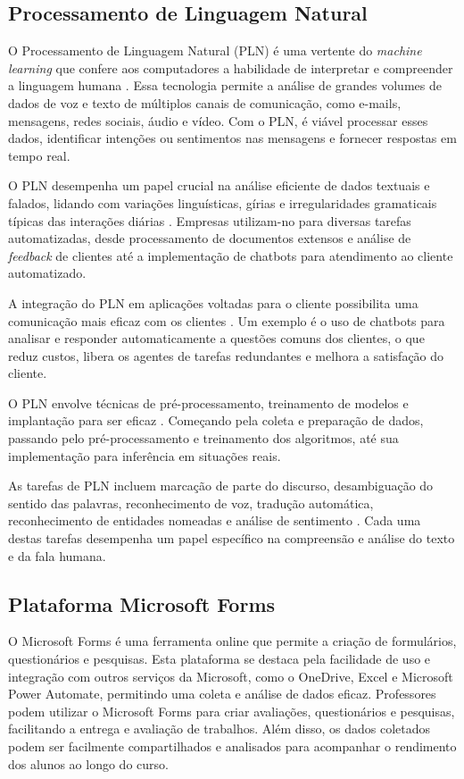 \subsection{Processamento de Linguagem Natural}

O Processamento de Linguagem Natural (PLN) é uma vertente do \textit{machine learning} que confere aos computadores a habilidade de interpretar e compreender a linguagem humana \cite{amazonnlp2023}. Essa tecnologia permite a análise de grandes volumes de dados de voz e texto de múltiplos canais de comunicação, como e-mails, mensagens, redes sociais, áudio e vídeo. Com o PLN, é viável processar esses dados, identificar intenções ou sentimentos nas mensagens e fornecer respostas em tempo real.

O PLN desempenha um papel crucial na análise eficiente de dados textuais e falados, lidando com variações linguísticas, gírias e irregularidades gramaticais típicas das interações diárias \cite{amazonnlp2023}. Empresas utilizam-no para diversas tarefas automatizadas, desde processamento de documentos extensos e análise de \textit{feedback} de clientes até a implementação de chatbots para atendimento ao cliente automatizado.

A integração do PLN em aplicações voltadas para o cliente possibilita uma comunicação mais eficaz com os clientes \cite{amazonnlp2023}. Um exemplo é o uso de chatbots para analisar e responder automaticamente a questões comuns dos clientes, o que reduz custos, libera os agentes de tarefas redundantes e melhora a satisfação do cliente.

O PLN envolve técnicas de pré-processamento, treinamento de modelos e implantação para ser eficaz \cite{amazonnlp2023}. Começando pela coleta e preparação de dados, passando pelo pré-processamento e treinamento dos algoritmos, até sua implementação para inferência em situações reais.

As tarefas de PLN incluem marcação de parte do discurso, desambiguação do sentido das palavras, reconhecimento de voz, tradução automática, reconhecimento de entidades nomeadas e análise de sentimento \cite{amazonnlp2023}. Cada uma destas tarefas desempenha um papel específico na compreensão e análise do texto e da fala humana.

\subsection{Plataforma Microsoft Forms}

O Microsoft Forms é uma ferramenta online que permite a criação de formulários, questionários e pesquisas. Esta plataforma se destaca pela facilidade de uso e integração com outros serviços da Microsoft, como o OneDrive, Excel e Microsoft Power Automate, permitindo uma coleta e análise de dados eficaz. Professores podem utilizar o Microsoft Forms para criar avaliações, questionários e pesquisas, facilitando a entrega e avaliação de trabalhos. Além disso, os dados coletados podem ser facilmente compartilhados e analisados para acompanhar o rendimento dos alunos ao longo do curso.

